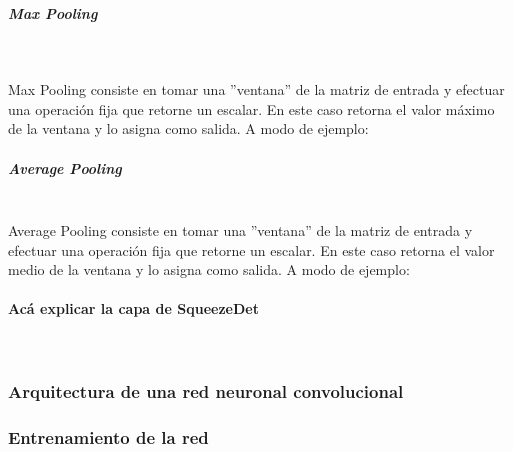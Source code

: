 \subparagraph{Max Pooling}\mbox{}\\
\bigbreak

Max Pooling consiste en tomar una ''ventana'' de la matriz de entrada y efectuar una operación fija que retorne un escalar. En este caso retorna el valor máximo de la ventana y lo asigna como salida. A modo de ejemplo:\par

\begin{figure}[!h]
    \centering
     
    \label{fig:maxpooling}
\end{figure}

\subparagraph{Average Pooling}\mbox{}\\

Average Pooling consiste en tomar una ''ventana'' de la matriz de entrada y efectuar una operación fija que retorne un escalar. En este caso retorna el valor medio de la ventana y lo asigna como salida. A modo de ejemplo:\par

\begin{figure}[!h]
    \centering
     
    \label{fig:averagepooling}
\end{figure}

\paragraph{Acá explicar la capa de SqueezeDet}\mbox{}\\

\subsubsection{Arquitectura de una red neuronal convolucional}

\subsubsection{Entrenamiento de la red}